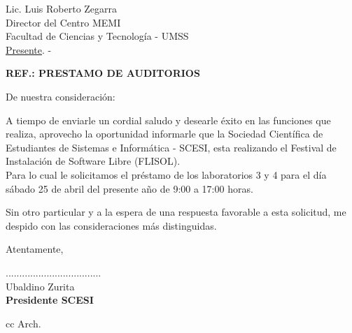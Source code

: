 \documentclass[letterpaper,12pt]{letter}
\begin{document}
\date {\today}
\begin{letter}{Lic. Luis Roberto Zegarra \\ Director del Centro MEMI \\ Facultad de Ciencias y Tecnolog\'ia - UMSS \\ \underline {Presente}. -}

\begin{center}
	\opening{\textbf{REF.: PRESTAMO DE AUDITORIOS}}
\end{center}

De nuestra consideración:

A tiempo de enviarle un cordial saludo y desearle éxito en las funciones que realiza, aprovecho la oportunidad informarle que la Sociedad Cient\'ifica de Estudiantes de Sistemas e Inform\'atica - SCESI, esta realizando el Festival de Instalación de Software Libre (FLISOL).\\

Para lo cual le solicitamos el préstamo de los laboratorios 3 y 4 para el día sábado 25 de abril del presente año de 9:00 a 17:00 horas.

Sin otro particular y a la espera de una respuesta favorable a esta solicitud, me despido con las 
consideraciones más distinguidas.

Atentamente,

\vspace{2.5cm}

\begin{center}
...................................\\
Ubaldino Zurita\\
{\bfseries Presidente SCESI}
\end{center}
\vspace{1cm}
cc Arch.
\end{letter}
\end{document}
